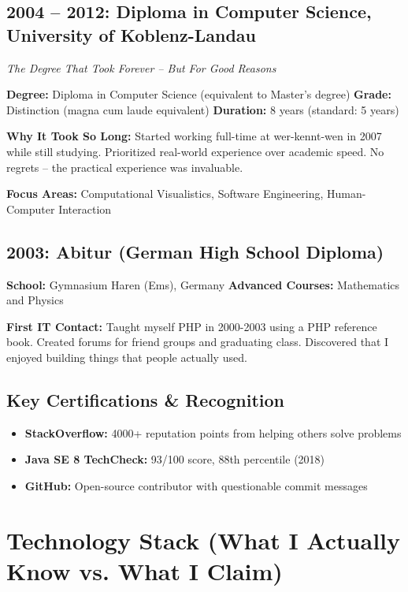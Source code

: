 \documentclass[10pt,a4paper]{article}
\begin{document}
\subsection{2004 -- 2012: Diploma in Computer Science, University of Koblenz-Landau}
\textit{The Degree That Took Forever -- But For Good Reasons}

\textbf{Degree:} Diploma in Computer Science (equivalent to Master's degree)
\textbf{Grade:} Distinction (magna cum laude equivalent)
\textbf{Duration:} 8 years (standard: 5 years)

\textbf{Why It Took So Long:} Started working full-time at wer-kennt-wen in 2007 while still studying. Prioritized real-world experience over academic speed. No regrets -- the practical experience was invaluable.

\textbf{Focus Areas:} Computational Visualistics, Software Engineering, Human-Computer Interaction

\subsection{2003: Abitur (German High School Diploma)}
\textbf{School:} Gymnasium Haren (Ems), Germany
\textbf{Advanced Courses:} Mathematics and Physics

\textbf{First IT Contact:} Taught myself PHP in 2000-2003 using a PHP reference book. Created forums for friend groups and graduating class. Discovered that I enjoyed building things that people actually used.

\subsection{Key Certifications \& Recognition}
\begin{itemize}
    \item \textbf{StackOverflow:} 4000+ reputation points from helping others solve problems
    \item \textbf{Java SE 8 TechCheck:} 93/100 score, 88th percentile (2018)
    \item \textbf{GitHub:} Open-source contributor with questionable commit messages
\end{itemize}

\section{Technology Stack (What I Actually Know vs. What I Claim)}
\end{document}
